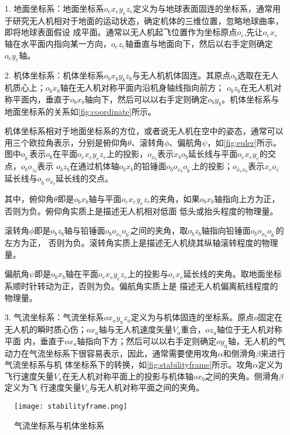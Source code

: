\begin{itemize}
\item [1.] 
    地面坐标系：地面坐标系$o_{e}x_{e}y_{e}z_{e}$定义为与地球表面固连的坐标系，通常用于研究无人机相对于地面的运动状态，确定机体的三维位置，忽略地球曲率，即将地球表面假设
    成平面。通常以无人机起飞位置作为坐标原点$o_{e}$,先让$o_{e}x_{e}$轴在水平面内指向某一方向，$o_{e}z_{e}$轴垂直与地面向下，然后以右手定则确定$o_{e}y_{e}$轴。       
\item [2.]
    机体坐标系：机体坐标系$o_{b}x_{b}y_{b}z_{b}$与无人机机体固连。其原点$o_{b}$选取在无人机质心上；$o_{b}x_{b}$轴在无人机对称平面内沿机身轴线指向前方；
    $o_{b}z_{b}$在无人机对称平面内，垂直于$o_{b}x_{b}$轴向下，然后可以以右手定则确定$o_{b}y_{b}$。机体坐标系与地面坐标系的关系如\autoref{fig:coordinate}所示。

    机体坐标系相对于地面坐标系的方位，或者说无人机在空中的姿态，通常可以用三个欧拉角表示，分别是俯仰角$\theta$、滚转角$\phi$、偏航角$\psi$，如\autoref{fig:euler}所示。
    图中$o_{b^{'}}$表示$o_{b}$在平面$o_{e}x_{e}y_{e}z_{e}$上的投影，$o_{x_{b}}$表示$x_{b}o_{b}$延长线与平面$o_{e}x_{e}y_{e}$的交点，$o_{b}o_{z_{b}}$表示
    $o_{b}z_{b}$在通过机体轴$o_{b}x_{b}$的铅锤面$o_{b}o_{x_{b}}o_{b^{'}}$上的投影；$o_{x_{e}x_{b}}$表示$x_{e}o_{e}$延长线与$o_{b^{'}}o_{x_{b}}$延长线的交点。

    其中，俯仰角$\theta$即是$o_{b}x_{b}$轴与平面$o_{e}x_{e}y_{e}z_{e}$的夹角，如果$o_{b}x_{b}$轴指向上方为正，否则为负。俯仰角实质上是描述无人机相对低面
    低头或抬头程度的物理量。

    滚转角$\phi$即是$o_{b}z_{b}$轴与铅锤面$o_{b}o_{x_{b}}o_{b^{'}}$之间的夹角，取$o_{b}z_{b}$轴指向铅锤面$o_{b}o_{x_{b}}o_{b^{'}}$的左方为正，
    否则为负。滚转角实质上是描述无人机绕其纵轴滚转程度的物理量。

    偏航角$\psi$即是$o_{b}x_{b}$轴在平面$o_{e}x_{e}y_{e}z_{e}$上的投影与$o_{e}x_{e}$延长线的夹角。取地面坐标系顺时针转动为正，否则为负。偏航角实质上是
    描述无人机偏离航线程度的物理量。

\item [3.]
气流坐标系：气流坐标系$ox_{a}y_{a}z_{a}$定义为与机体固连的坐标系。原点$o$固定在无人机的瞬时质心伤；$ox_{a}$轴与无人机速度矢量$V_{a}$重合，$oz_{a}$轴位于无人机对称平面
内，垂直于$ox_{a}$轴指向下方；然后可以以右手定则确定$oy_{a}$轴，无人机的气动力在气流坐标系下很容易表示，因此，通常需要使用攻角$\alpha$和侧滑角$\beta$来进行气流坐标系与机
体坐标系下的转换，如\autoref{fig:stabilityframe}所示。攻角$\alpha$定义为飞行速度矢量$V_{a}$在无人机对称平面上的投影与机体轴$ox_{b}$之间的夹角。侧滑角$\beta$定义为飞
行速度矢量$V_{a}$与无人机对称平面之间的夹角。
\end{itemize}
\begin{figure}[htbp]
    \centering
    \texttt{[image: stabilityframe.png]}
    \caption{\label{fig:stabilityframe}气流坐标系与机体坐标系}
\end{figure}
